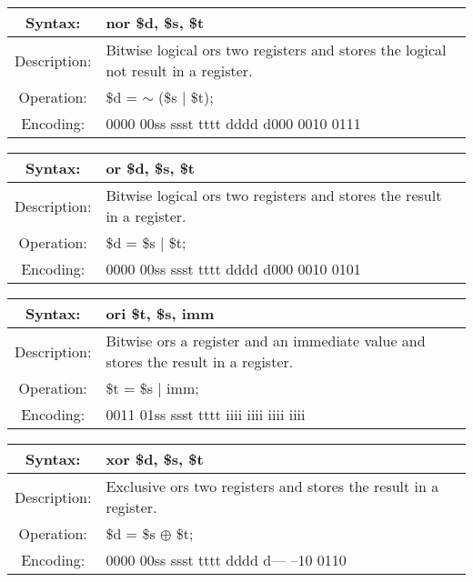     \begin{table}[!hbp]
    \begin{tabularx}{\textwidth}{|c|X|}
        \hline
        Syntax: & nor \$d, \$s, \$t \\
        \hline
        Description: & Bitwise logical ors two registers and stores the logical not result in a register. \\
        \hline
        Operation: & \$d = $\sim$ (\$s | \$t); \\
        \hline
        Encoding: & 0000 00ss ssst tttt dddd d000 0010 0111 \\
        \hline
    \end{tabularx}
    \end{table}

    \begin{table}[!hbp]
    \begin{tabularx}{\textwidth}{|c|X|}
        \hline
        Syntax: & or \$d, \$s, \$t \\
        \hline
        Description: & Bitwise logical ors two registers and stores the result in a register. \\
        \hline
        Operation: & \$d = \$s | \$t; \\
        \hline
        Encoding: & 0000 00ss ssst tttt dddd d000 0010 0101 \\
        \hline
    \end{tabularx}
    \end{table}

    \begin{table}[!hbp]
    \begin{tabularx}{\textwidth}{|c|X|}
        \hline
        Syntax: & ori \$t, \$s, imm \\
        \hline
        Description: & Bitwise ors a register and an immediate value and stores the result in a register. \\
        \hline
        Operation: & \$t = \$s | imm; \\
        \hline
        Encoding: & 0011 01ss ssst tttt iiii iiii iiii iiii \\
        \hline
    \end{tabularx}
    \end{table}

    \begin{table}[!hbp]
    \begin{tabularx}{\textwidth}{|c|X|}
        \hline
        Syntax: & xor \$d, \$s, \$t \\
        \hline
        Description: & Exclusive ors two registers and stores the result in a register. \\
        \hline
        Operation: & \$d = \$s $\oplus$ \$t; \\
        \hline
        Encoding: & 0000 00ss ssst tttt dddd d--- --10 0110 \\
        \hline
    \end{tabularx}
    \end{table}

